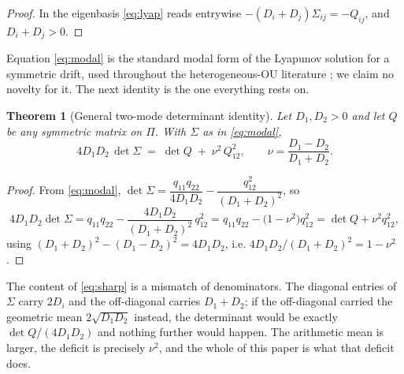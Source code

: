 \documentclass[11pt]{article}
\theoremstyle{plain}
\newtheorem{theorem}{Theorem}
\theoremstyle{definition}
\theoremstyle{remark}
\newcommand{\Sig}{\Sigma}
\begin{document}
\begin{proof}
In the eigenbasis \eqref{eq:lyap} reads entrywise $-(D_i+D_j)\Sig_{ij}=-Q_{ij}$, and
$D_i+D_j>0$.
\end{proof}

Equation \eqref{eq:modal} is the standard modal form of the Lyapunov solution for a symmetric
drift, used throughout the heterogeneous-OU literature
\cite{Barucca2014,GodrecheLuck2019,FerreiraMetzBarucca2025}; we claim no novelty for it. The
next identity is the one everything rests on.

\begin{theorem}[General two-mode determinant identity]\label{thm:sharp}
Let $D_1,D_2>0$ and let $Q$ be any symmetric matrix on $\Pi$. With $\Sig$ as in
\eqref{eq:modal},
\begin{equation}
  4D_1D_2\,\det\Sig \;=\; \det Q \;+\; \nu^2\,Q_{12}^2,
  \qquad \nu=\frac{D_1-D_2}{D_1+D_2}. \label{eq:sharp}
\end{equation}
\end{theorem}

\begin{proof}
From \eqref{eq:modal},
$\det\Sig=\dfrac{q_{11}q_{22}}{4D_1D_2}-\dfrac{q_{12}^2}{(D_1+D_2)^2}$, so
\[
  4D_1D_2\det\Sig
  = q_{11}q_{22}-\frac{4D_1D_2}{(D_1+D_2)^2}\,q_{12}^2
  = q_{11}q_{22}-\bigl(1-\nu^2\bigr)q_{12}^2
  = \det Q+\nu^2q_{12}^2,
\]
using $(D_1+D_2)^2-(D_1-D_2)^2=4D_1D_2$, i.e. $4D_1D_2/(D_1+D_2)^2=1-\nu^2$.
\end{proof}

The content of \eqref{eq:sharp} is a mismatch of denominators. The diagonal entries of $\Sig$
carry $2D_i$ and the off-diagonal carries $D_1+D_2$; if the off-diagonal carried the geometric
mean $2\sqrt{D_1D_2}$ instead, the determinant would be exactly $\det Q/(4D_1D_2)$ and nothing
further would happen. The arithmetic mean is larger, the deficit is precisely $\nu^2$, and the
whole of this paper is what that deficit does.
\end{document}
